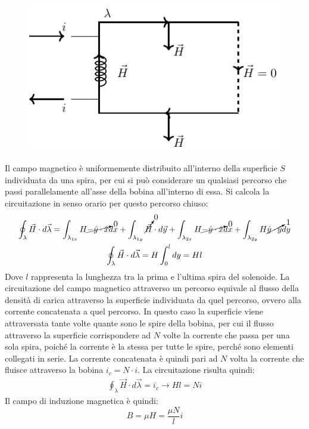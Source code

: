 \documentclass{article}
\numberwithin{equation}{subsection}
\begin{document}
\begin{figure}[H]%
    \centering
    \includegraphics{induttore-fisico.pdf}
    \label{fig:induttore-fisico}
\end{figure}

Il campo magnetico è uniformemente distribuito all'interno della superficie $S$ individuata da una spira, per cui si può considerare un qualsiasi percorso che passi parallelamente 
all'asse della bobina all'interno di essa. Si calcola la circuitazione in senso orario per questo percorso chiuso:
\begin{gather*}
    \displaystyle\oint_{\lambda}\vec{H}\cdot d\vec{\lambda}=\int_{\lambda_{1x}}H\cancelto{0}{-\hat{y}\cdot\hat{x}}dx+\int_{\lambda_{1y}}\cancelto{0}{\vec{H}}\cdot d\vec{y}+\int_{\lambda_{2x}}H\cancelto{0}{-\hat{y}\cdot\hat{x}}dx+\int_{\lambda_{2y}}H\cancelto{1}{\hat{y}\cdot\hat{y}}dy\\
    \displaystyle\oint_{\lambda}\vec{H}\cdot d\vec{\lambda}=H\int_0^ldy=Hl
\end{gather*}
Dove $l$ rappresenta la lunghezza tra la prima e l'ultima spira del solenoide. La circuitazione del campo magnetico attraverso un percorso equivale al 
flusso della densità di carica attraverso la superficie individuata da quel percorso, ovvero alla corrente concatenata a quel percorso. In questo caso la superficie 
viene attraversata tante volte quante sono le spire della bobina, per cui il flusso attraverso la superficie corrispondere ad $N$ volte la corrente che passa per una sola spira, 
poiché la corrente è la stessa per tutte le spire, perché sono elementi collegati in serie. La corrente concatenata è quindi pari ad $N$ volta la corrente che fluisce 
attraverso la bobina $i_c=N\cdot i$. La circuitazione risulta quindi:
\begin{gather*}
    \displaystyle\oint_{\lambda}\vec{H}\cdot d\vec{\lambda}=i_c\to Hl=Ni
\end{gather*}
Il campo di induzione magnetica è quindi:
\begin{equation*}
    B=\mu H=\displaystyle\frac{\mu N}{l}i
\end{equation*}
\end{document}
